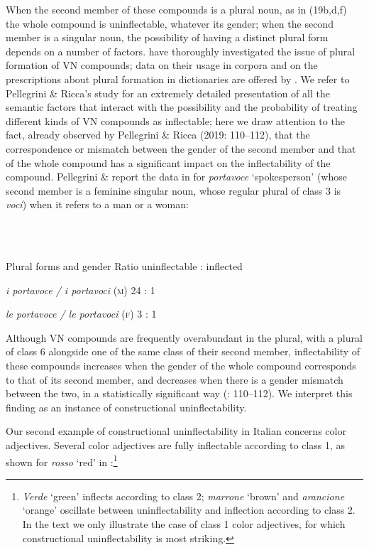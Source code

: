 \documentclass[output=paper]{langscibook}
\begin{document}
When the second member of these compounds is a plural noun, as in (19b,d,f) the whole compound is uninflectable, whatever its gender; when the second member is a singular noun, the possibility of having a distinct plural form depends on a number of factors. \citet{PellegriniRicca2019} have thoroughly investigated the issue of plural formation of VN compounds; data on their usage in corpora and on the prescriptions about plural formation in dictionaries are offered by \citet{Micheli2016}. We refer to Pellegrini \& Ricca’s study for an extremely detailed presentation of all the semantic factors that interact with the possibility and the probability of treating different kinds of VN compounds as inflectable; here we draw attention to the fact, already observed by Pellegrini \& Ricca (2019: 110–112), that the correspondence or mismatch between the gender of the second member and that of the whole compound has a significant impact on the inflectability of the compound. Pellegrini \& \citet[110]{Ricca2019} report the data in  for \textit{portavoce} ‘spokesperson’ (whose second member is a feminine singular noun, whose regular plural of class 3 is \textit{voci}) when it refers to a man or a woman:

\ea%
    \label{ex:key:20}
    \gll \\
         \\
    \glt
    \z %

          Plural forms and gender    Ratio uninflectable : inflected

  \textit{i portavoce / i portavoci} (\textsc{m})    24 : 1

  \textit{le portavoce / le portavoci} (\textsc{f)}     \textsc{3} \textsc{:} \textsc{1}

Although VN compounds are frequently overabundant in the plural, with a plural of class 6 alongside one of the same class of their second member, inflectability of these compounds increases when the gender of the whole compound corresponds to that of its second member, and decreases when there is a gender mismatch between the two, in a statistically significant way (\citealt{PellegriniRicca2019}: 110–112). We interpret this finding as an instance of constructional uninflectability.

Our second example of constructional uninflectability in Italian concerns color adjectives. Several color adjectives are fully inflectable according to class 1, as shown for \textit{rosso} ‘red’ in :\footnote{\textit{Verde} ‘green’ inflects according to class 2; \textit{marrone} ‘brown’ and \textit{arancione} ‘orange’ oscillate between uninflectability and inflection according to class 2. In the text we only illustrate the case of class 1 color adjectives, for which constructional uninflectability is most striking.}
\end{document}
